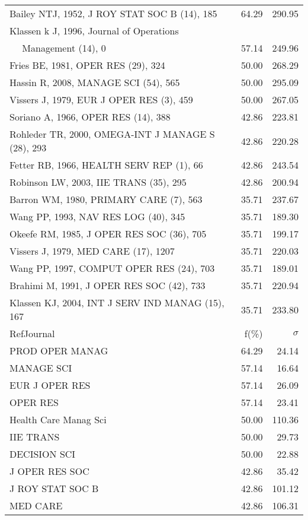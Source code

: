 \documentclass[a4paper,11pt]{report}
\begin{document}
\begin{landscape}
\begin{table}[!ht]
{\begin{tabular}{|l r r|}
Bailey NTJ, 1952, J ROY STAT SOC B (14), 185 & 64.29 & 290.95\\
Klassen k J, 1996, Journal of Operations &  & \\
$\quad$ Management (14), 0 & 57.14 & 249.96\\
Fries BE, 1981, OPER RES (29), 324 & 50.00 & 268.29\\
Hassin R, 2008, MANAGE SCI (54), 565 & 50.00 & 295.09\\
Vissers J, 1979, EUR J OPER RES (3), 459 & 50.00 & 267.05\\
Soriano A, 1966, OPER RES (14), 388 & 42.86 & 223.81\\
Rohleder TR, 2000, OMEGA-INT J MANAGE S (28), 293 & 42.86 & 220.28\\
Fetter RB, 1966, HEALTH SERV REP (1), 66 & 42.86 & 243.54\\
Robinson LW, 2003, IIE TRANS (35), 295 & 42.86 & 200.94\\
Barron WM, 1980, PRIMARY CARE (7), 563 & 35.71 & 237.67\\
Wang PP, 1993, NAV RES LOG (40), 345 & 35.71 & 189.30\\
Okeefe RM, 1985, J OPER RES SOC (36), 705 & 35.71 & 199.17\\
Vissers J, 1979, MED CARE (17), 1207 & 35.71 & 220.03\\
Wang PP, 1997, COMPUT OPER RES (24), 703 & 35.71 & 189.01\\
Brahimi M, 1991, J OPER RES SOC (42), 733 & 35.71 & 220.94\\
Klassen KJ, 2004, INT J SERV IND MANAG (15), 167 & 35.71 & 233.80\\
\hline
\hline
RefJournal & f(\%) & $\sigma$\\
\hline
PROD OPER MANAG & 64.29 & 24.14\\
MANAGE SCI & 57.14 & 16.64\\
EUR J OPER RES & 57.14 & 26.09\\
OPER RES & 57.14 & 23.41\\
Health Care Manag Sci & 50.00 & 110.36\\
IIE TRANS & 50.00 & 29.73\\
DECISION SCI & 50.00 & 22.88\\
J OPER RES SOC & 42.86 & 35.42\\
J ROY STAT SOC B & 42.86 & 101.12\\
MED CARE & 42.86 & 106.31\\
\hline
\end{tabular}
}
\end{table}


\end{landscape}
\end{document}
